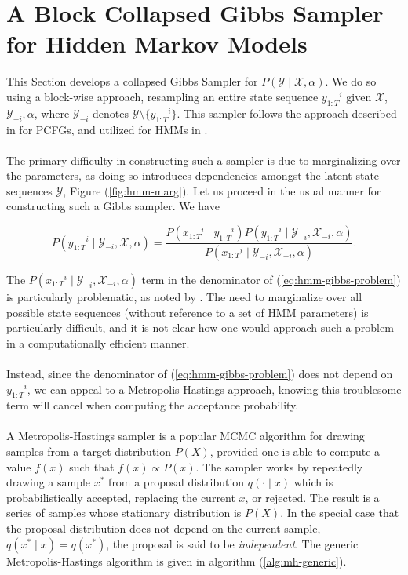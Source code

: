 \documentclass[12pt]{report}
\newcommand{\1}[0]{\mathbbm{1}}
\newcommand{\seq}[3]{\ensuremath{#1_{{#2}:{#3}}}}
\begin{document}
\section{A Block Collapsed Gibbs Sampler for Hidden Markov Models} \label{sec:collapsed-sampler}
This Section develops a collapsed Gibbs Sampler for $P(\mathcal{Y} \mid \mathcal{X}, \alpha)$.
We do so using a block-wise approach, resampling an entire state sequence $\seq{y}{1}{T}^i$ given
$\mathcal{X}$, $\mathcal{Y}_{-i}, \alpha$, where $\mathcal{Y}_{-i}$ denotes 
$\mathcal{Y} \setminus \{\seq{y}{1}{T}^i\}$. This sampler follows the approach 
described in \cite{pcfg-bayesian-johnson} for \acp{PCFG}, and utilized 
for \acp{HMM} in \cite{hmm-comparison-johnson}. 
\\\\
The primary difficulty in constructing such a sampler is due to marginalizing over the parameters,
as doing so introduces dependencies amongst the latent state sequences $\mathcal{Y}$, Figure (\ref{fig:hmm-marg}). 
Let us proceed in the usual manner for constructing such a Gibbs sampler. We have 

\begin{equation}
    P(\seq{y}{1}{T}^i \mid \mathcal{Y}_{-i}, \mathcal{X}, \alpha) 
    = \frac{P(\seq{x}{1}{T}^i \mid \seq{y}{1}{T}^i)P(\seq{y}{1}{T}^i \mid \mathcal{Y}_{-i}, \mathcal{X}_{-i}, \alpha)}
      {P(\seq{x}{1}{T}^i \mid \mathcal{Y}_{-i}, \mathcal{X}_{-i}, \alpha)}. \label{eq:hmm-gibbs-problem}
\end{equation}

The $P(\seq{x}{1}{T}^i \mid \mathcal{Y}_{-i}, \mathcal{X}_{-i}, \alpha)$ term in the denominator 
of (\ref{eq:hmm-gibbs-problem}) is particularly problematic, as noted by \cite{pcfg-bayesian-johnson}. 
The need to marginalize over all possible state sequences (without reference to a set of \ac{HMM} parameters) 
is particularly difficult, and it is not clear how one would approach such a problem
in a computationally efficient manner.
\\\\
Instead, since the denominator of (\ref{eq:hmm-gibbs-problem}) does not depend on $\seq{y}{1}{T}^i$, 
we can appeal to a Metropolis-Hastings approach, knowing this troublesome term will cancel when 
computing the acceptance probability. 
\\\\
A Metropolis-Hastings sampler \cite{mcmc-ml} is a popular \ac{MCMC} algorithm for drawing samples
from a target distribution $P(X)$, provided one is able to compute a value
$f(x)$ such that $f(x) \propto P(x)$. The sampler works by repeatedly drawing a 
sample $x^*$ from a proposal distribution $q(\cdot \mid x)$ which is probabilistically
accepted, replacing the current $x$, or rejected. The result is a series of samples 
whose stationary distribution is $P(X)$. In the special case that the proposal distribution
does not depend on the current sample, $q(x^* \mid x) = q(x^*)$, the proposal is said to 
be \emph{independent}. The generic Metropolis-Hastings algorithm is given in algorithm (\ref{alg:mh-generic}).
\end{document}
